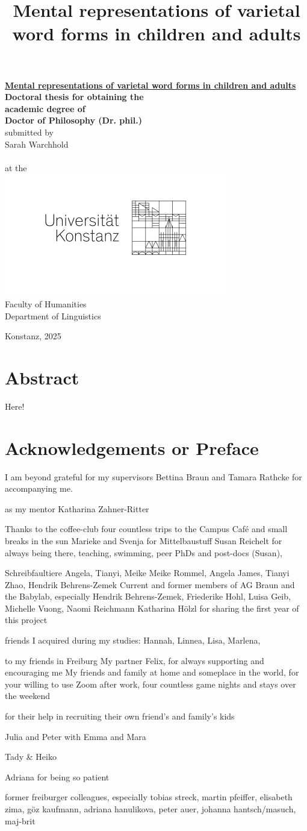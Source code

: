 \documentclass[
  11pt,
  a4paper,
  nottoc]{report}
\title{Mental representations of varietal word forms in children and
adults}
\date{}
\def\maketitle{
\pagenumbering{roman}
{\sf\thispagestyle{empty}%
\newgeometry{top=6cm,left=2cm,right=2cm,bottom=2.5cm}
\doublespacing
\sffamily
  \begin{center}\fontsize{18}{21.6}\sf
     \ul{\textbf{Mental representations of varietal word forms in
children and adults}}\\[2cm]
     \vfill
     {\fontsize{14}{16.8} \selectfont
      \textbf{Doctoral thesis for obtaining the\\
      academic degree of\\
      Doctor of Philosophy (Dr. phil.)}\\
      }
	\vspace{12mm}
  {\fontsize{12}{14.4} \selectfont
submitted by\\
Sarah Warchhold\\
\ \\
at the\\
}
\vspace{5mm}
\includegraphics{konstanz-logo}\\
\vspace{20mm}
{\fontsize{12}{14.4} \selectfont
	Faculty of Humanities\\
	Department of Linguistics
}
\end{center}
\vfill{}
Konstanz, 2025
\newpage\mbox{}\thispagestyle{empty}

\newpage
\restoregeometry
\rmfamily
}
}
\begin{document}
\maketitle

\linespread{1.5}
\setcounter{page}{1}  %

\chapter*{Abstract}\label{abstract}
Here!



\chapter*{Acknowledgements or Preface}\label{acknowledgements}


I am beyond grateful for my supervisors Bettina Braun and Tamara Rathcke for accompanying me.

as my mentor Katharina Zahner-Ritter

Thanks to the coffee-club four countless trips to the Campus Café and small breaks in the sun
Marieke and Svenja for Mittelbaustuff
Susan Reichelt for always being there, teaching, swimming,
peer PhDs and post-docs (Susan),

Schreibfaultiere Angela, Tianyi, Meike
Meike Rommel, Angela James, Tianyi Zhao, Hendrik Behrens-Zemek
Current and former members of AG Braun and the Babylab, especially Hendrik Behrens-Zemek, Friederike Hohl, Luisa Geib, Michelle Vuong, Naomi Reichmann
Katharina Hölzl for sharing the first year of this project

friends I acquired during my studies: Hannah, Linnea, Lisa, Marlena,

to my friends in Freiburg
My partner Felix, for always supporting and encouraging me
My friends and family at home and someplace in the world, for your willing to use Zoom after work, four countless game nights and stays over the weekend

for their help in recruiting their own friend's and family's kids

Julia and Peter with Emma and Mara


Tady \& Heiko

Adriana for being so patient


former freiburger colleagues, especially tobias streck, martin pfeiffer, elisabeth zima, göz kaufmann, adriana hanulikova, peter auer, johanna hantsch/masuch, maj-brit
\end{document}
